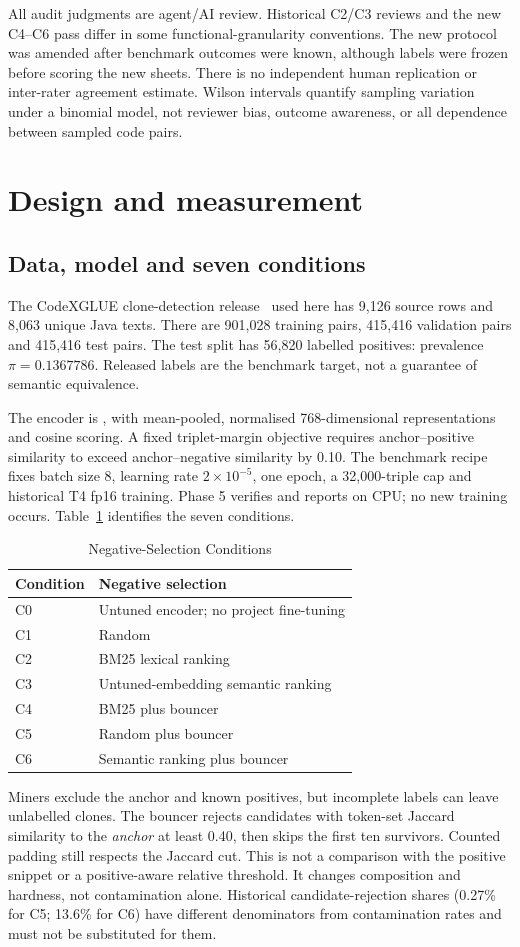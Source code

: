 \documentclass[conference]{IEEEtran}
\begin{document}
All audit judgments are agent/AI review. Historical C2/C3 reviews and the new
C4--C6 pass differ in some functional-granularity conventions. The new protocol
was amended after benchmark outcomes were known, although labels were frozen
before scoring the new sheets. There is no independent human replication or
inter-rater agreement estimate. Wilson intervals quantify sampling variation
under a binomial model, not reviewer bias, outcome awareness, or all dependence
between sampled code pairs.

\section{Design and measurement}
\subsection{Data, model and seven conditions}
The CodeXGLUE clone-detection release~\cite{codexglue} used here has 9,126 source
rows and 8,063 unique Java texts. There are 901,028 training pairs, 415,416
validation pairs and 415,416 test pairs. The test split has 56,820 labelled
positives: prevalence $\pi=0.1367786$. Released labels are the benchmark target,
not a guarantee of semantic equivalence.

The encoder is , with mean-pooled,
normalised 768-dimensional representations and cosine scoring. A fixed
triplet-margin objective requires anchor--positive similarity to exceed
anchor--negative similarity by 0.10. The benchmark recipe fixes batch size 8,
learning rate $2\times10^{-5}$, one epoch, a 32,000-triple cap and historical T4
fp16 training. Phase 5 verifies and reports on CPU; no new training occurs.
Table~\ref{tab:conditions} identifies the seven conditions.
\begin{table}[t]
\caption{Negative-Selection Conditions}
\label{tab:conditions}
\centering\footnotesize
\begin{tabular}{ll}
\toprule
Condition & Negative selection \\
\midrule
C0 & Untuned encoder; no project fine-tuning \\
C1 & Random \\
C2 & BM25 lexical ranking \\
C3 & Untuned-embedding semantic ranking \\
C4 & BM25 plus bouncer \\
C5 & Random plus bouncer \\
C6 & Semantic ranking plus bouncer \\
\bottomrule
\end{tabular}
\end{table}
Miners exclude the anchor and known positives, but incomplete labels can leave
unlabelled clones. The bouncer rejects candidates with token-set Jaccard
similarity to the \emph{anchor} at least 0.40, then skips the first ten
survivors. Counted padding still respects the Jaccard cut. This is not a
comparison with the positive snippet or a positive-aware relative threshold.
It changes composition and hardness, not contamination alone. Historical
candidate-rejection shares (0.27\% for C5; 13.6\% for C6) have different
denominators from contamination rates and must not be substituted for them.
\end{document}
